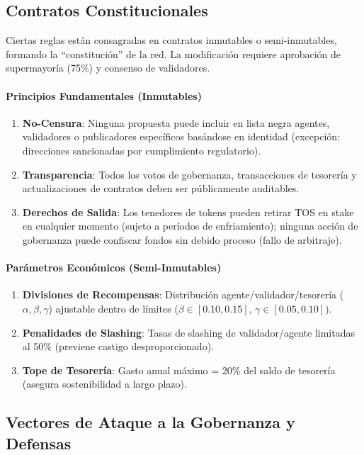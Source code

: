 \documentclass[11pt]{article}
\begin{document}
\subsection{Contratos Constitucionales}

Ciertas reglas están consagradas en contratos inmutables o semi-inmutables, formando la ``constitución'' de la red. La modificación requiere aprobación de supermayoría (75\%) y consenso de validadores.

\paragraph{Principios Fundamentales (Inmutables)}
\begin{enumerate}[noitemsep]
  \item \textbf{No-Censura}: Ninguna propuesta puede incluir en lista negra agentes, validadores o publicadores específicos basándose en identidad (excepción: direcciones sancionadas por cumplimiento regulatorio).
  \item \textbf{Transparencia}: Todos los votos de gobernanza, transacciones de tesorería y actualizaciones de contratos deben ser públicamente auditables.
  \item \textbf{Derechos de Salida}: Los tenedores de tokens pueden retirar TOS en stake en cualquier momento (sujeto a períodos de enfriamiento); ninguna acción de gobernanza puede confiscar fondos sin debido proceso (fallo de arbitraje).
\end{enumerate}

\paragraph{Parámetros Económicos (Semi-Inmutables)}
\begin{enumerate}[noitemsep]
  \item \textbf{Divisiones de Recompensas}: Distribución agente/validador/tesorería ($\alpha, \beta, \gamma$) ajustable dentro de límites ($\beta \in [0.10, 0.15]$, $\gamma \in [0.05, 0.10]$).
  \item \textbf{Penalidades de Slashing}: Tasas de slashing de validador/agente limitadas al 50\% (previene castigo desproporcionado).
  \item \textbf{Tope de Tesorería}: Gasto anual máximo = 20\% del saldo de tesorería (asegura sostenibilidad a largo plazo).
\end{enumerate}

\subsection{Vectores de Ataque a la Gobernanza y Defensas}
\end{document}
